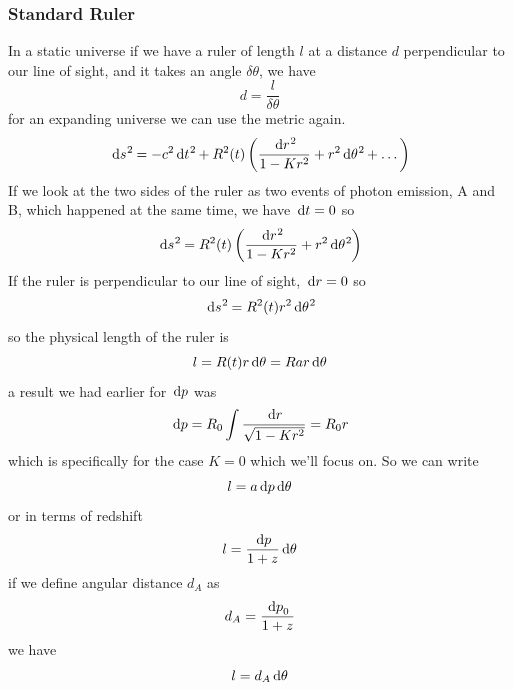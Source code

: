 \subsubsection{Standard Ruler}
In a static universe if we have a ruler of length \(l\) at a distance \(d\) perpendicular to our line of sight, and it takes an angle \(\delta\theta\), we have
\begin{equation}
    d = \frac{l}{\delta \theta}
\end{equation}
for an expanding universe we can use the metric again.
\begin{equation}
    \dl s^2 = - c^2 \dl t^2 + R^2(t) \ins{\frac{\dl r^2}{1-Kr^2} + r^2 \dl \theta^2 + \dots}
\end{equation}
If we look at the two sides of the ruler as two events of photon emission, A and B, which happened at the same time, we have \(\dl t = 0\) so
\begin{equation}
    \dl s^2 = R^2(t) \ins{\frac{\dl r^2}{1-Kr^2} + r^2 \dl \theta^2}
\end{equation}
If the ruler is perpendicular to our line of sight, \(\dl r = 0\) so
\begin{equation}
    \dl s^2 = R^2(t) r^2 \dl \theta^2
\end{equation}
so the physical length of the ruler is
\begin{equation}
    l = R(t) r \dl \theta = Rar \dl \theta
\end{equation}
a result we had earlier for \(\dl p\) was
\begin{equation}
    \dl p = R_0\int\frac{\dl r}{\sqrt{1-Kr^2}} = R_0 r
\end{equation}
which is specifically for the case \(K=0\) which we'll focus on. So we can write
\begin{equation}
    l = a \dl p \dl \theta
\end{equation}
or in terms of redshift
\begin{equation}
    l = \frac{\dl p}{1+z} \dl \theta
\end{equation}
if we define angular distance \(d_A\) as
\begin{equation}
    d_A = \frac{\dl p_0}{1+z}
\end{equation}
we have
\begin{equation}
    l = d_A \dl \theta
\end{equation}
